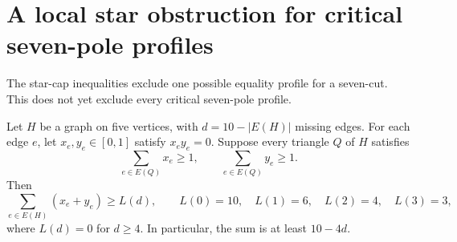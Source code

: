 \section{A local star obstruction for critical seven-pole profiles}
\label{sec:path-seven-star-obstruction}

The star-cap inequalities exclude one possible equality profile for a seven-cut.
This does not yet exclude every critical seven-pole profile.

\begin{lemma}
\label{lem:path-seven-triangle-covers}
Let $H$ be a graph on five vertices, with $d=10-|E(H)|$ missing edges.
For each edge $e$, let $x_e,y_e\in[0,1]$ satisfy $x_ey_e=0$.
Suppose every triangle $Q$ of $H$ satisfies
\[
 \sum_{e\in E(Q)}x_e\ge1,
 \qquad
 \sum_{e\in E(Q)}y_e\ge1.
\]
Then
\[
 \sum_{e\in E(H)}(x_e+y_e)\ge L(d),
 \qquad
 L(0)=10,\quad L(1)=6,\quad L(2)=4,\quad L(3)=3,
\]
where $L(d)=0$ for $d\ge4$.
In particular, the sum is at least $10-4d$.
\end{lemma}

